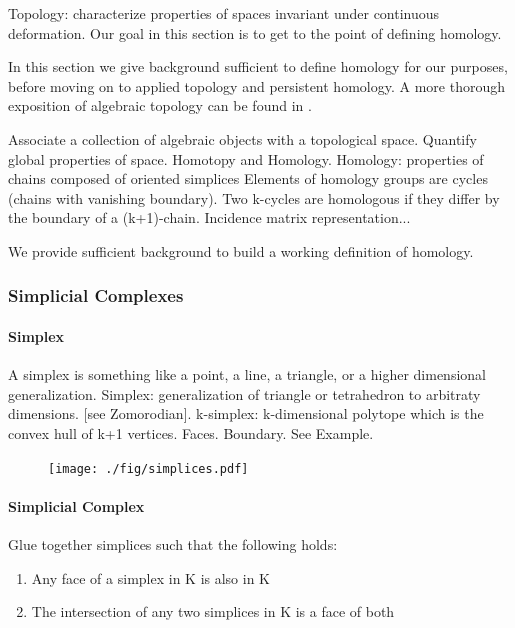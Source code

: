 Topology: characterize properties of spaces invariant under continuous deformation.
Our goal in this section is to get to the point of defining homology.

In this section we give background sufficient to define homology for our purposes, before moving on to applied topology and persistent homology.
A more thorough exposition of algebraic topology can be found in \cite{Hatcher:2002ut}.

Associate a collection of algebraic objects with a topological space.
Quantify global properties of space.
Homotopy and Homology.
Homology: properties of chains composed of oriented simplices
Elements of homology groups are cycles (chains with vanishing boundary).
Two k-cycles are homologous if they differ by the boundary of a (k+1)-chain.
Incidence matrix representation...

We provide sufficient background to build a working definition of homology.

\subsubsection{Simplicial Complexes}

\paragraph{Simplex}

A simplex is something like a point, a line, a triangle, or a higher dimensional generalization.
Simplex: generalization of triangle or tetrahedron to arbitraty dimensions. [see Zomorodian].
k-simplex: k-dimensional polytope which is the convex hull of k+1 vertices.
Faces. Boundary.
See Example.

\begin{figure}
\centering
\texttt{[image: ./fig/simplices.pdf]}
\caption[Simplices]{}
\label{background:fig:simplices}
\end{figure}

\paragraph{Simplicial Complex}

Glue together simplices such that the following holds:

\begin{enumerate}
\item Any face of a simplex in K is also in K
\item The intersection of any two simplices in K is a face of both 
\end{enumerate}

